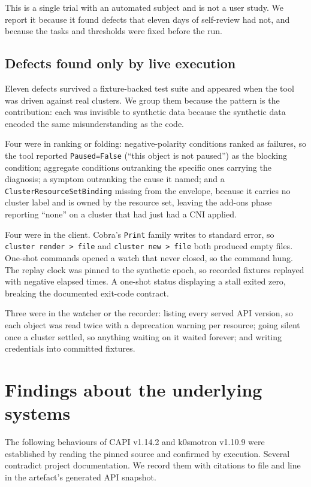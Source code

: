 \documentclass[conference]{IEEEtran}
\begin{document}
This is a single trial with an automated subject and is not a user study. We
report it because it found defects that eleven days of self-review had not, and
because the tasks and thresholds were fixed before the run.

\subsection{Defects found only by live execution}
\label{sec:defects}

Eleven defects survived a fixture-backed test suite and appeared when the tool was
driven against real clusters. We group them because the pattern is the
contribution: each was invisible to synthetic data because the synthetic data
encoded the same misunderstanding as the code.

Four were in ranking or folding: negative-polarity conditions ranked as failures,
so the tool reported \texttt{Paused=False} (``this object is not paused'') as the
blocking condition; aggregate conditions outranking the specific ones carrying the
diagnosis; a symptom outranking the cause it named; and a
\texttt{ClusterResourceSetBinding} missing from the envelope, because it carries
no cluster label and is owned by the resource set, leaving the add-ons phase
reporting ``none'' on a cluster that had just had a CNI applied.

Four were in the client. Cobra's \texttt{Print} family writes to standard error, so
\texttt{cluster render > file} and \texttt{cluster new > file} both produced empty
files. One-shot commands opened a watch that never closed, so the command hung.
The replay clock was pinned to the synthetic epoch, so recorded fixtures replayed
with negative elapsed times. A one-shot status displaying a stall exited zero,
breaking the documented exit-code contract.

Three were in the watcher or the recorder: listing every served API version, so
each object was read twice with a deprecation warning per resource; going silent
once a cluster settled, so anything waiting on it waited forever; and writing
credentials into committed fixtures.

\section{Findings about the underlying systems}
\label{sec:findings}

The following behaviours of CAPI v1.14.2 and k0smotron v1.10.9 were established by
reading the pinned source and confirmed by execution. Several contradict project
documentation. We record them with citations to file and line in the artefact's
generated API snapshot.
\end{document}
